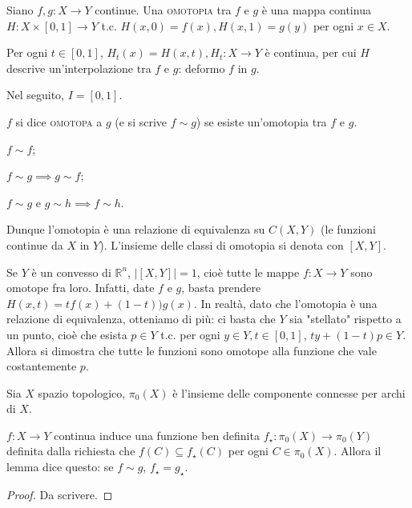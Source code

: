 \begin{defn}
  Siano $f, g:X \rightarrow Y$ continue. Una \textsc{omotopia} tra $f$ e $g$ è una mappa continua $H:X \times [0, 1] \rightarrow Y$ t.c. $H(x, 0)=f(x), H(x, 1)=g(y)$ per ogni $x \in X$.
\end{defn}

\begin{ftt}
  Per ogni $t \in [0, 1]$, $H_t(x)=H(x, t), H_t:X \rightarrow Y$ è continua, per cui $H$ descrive un'interpolazione tra $f$ e $g$: deformo $f$ in $g$.
\end{ftt}

Nel seguito, $I=[0, 1]$.

\begin{defn}
  $f$ si dice \textsc{omotopa} a $g$ (e si scrive $f \sim g$) se esiste un'omotopia tra $f$ e $g$.
\end{defn}

\begin{ftt}
  \begin{nlist}
    \item $f \sim f$;
    \item $f \sim g \implies g \sim f$;
    \item $f \sim g$ e $g \sim h \implies f \sim h$.
  \end{nlist}
  Dunque l'omotopia è una relazione di equivalenza su $C(X, Y)$ (le funzioni continue da $X$ in $Y$). L'insieme delle classi di omotopia si denota con $[X, Y]$.
\end{ftt}

\begin{ex}
  Se $Y$ è un convesso di $\mathbb{R}^n$, $|[X, Y]|=1$, cioè tutte le mappe $f:X \rightarrow Y$ sono omotope fra loro. Infatti, date $f$ e $g$, basta prendere $H(x, t)=tf(x)+(1-t))g(x)$. In realtà, dato che l'omotopia è una relazione di equivalenza, otteniamo di più: ci basta che $Y$ sia "stellato" rispetto a un punto, cioè che esista $p \in Y$ t.c. per ogni $y \in Y, t \in [0, 1]$, $ty+(1-t)p \in Y$. Allora si dimostra che tutte le funzioni sono omotope alla funzione che vale costantemente $p$.
\end{ex}

\begin{defn}
  Sia $X$ spazio topologico, $\pi_0(X)$ è l'insieme delle componente connesse per archi di $X$.
\end{defn}

\begin{lm}
  $f:X \rightarrow Y$ continua induce una funzione ben definita $f_{\star}:\pi_0(X) \rightarrow \pi_0(Y)$ definita dalla richiesta che $f(C) \subseteq f_{\star}(C)$ per ogni $C \in \pi_0(X)$. Allora il lemma dice questo: se $f \sim g$, $f_{\star}=g_{\star}$.
\end{lm}

\begin{proof}
  Da scrivere.
\end{proof}
